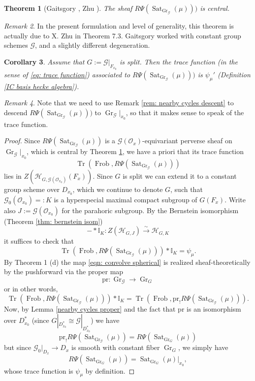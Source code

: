 \documentclass[reqno]{amsart}
\numberwithin{equation}{section}
\newcommand{\mbb}[1]{\mathbb{#1}}
\newcommand{\Cal}[1]{\mathcal{#1}}
\newcommand{\co}{\colon}
\newcommand{\mrm}[1]{\mathrm{#1}}
\DeclareMathOperator{\Frob}{Frob}
\DeclareMathOperator{\Tr}{Tr}
\DeclareMathOperator{\Gr}{Gr}
\DeclareMathOperator{\Sat}{Sat}
\newtheorem{thm}{Theorem}[section]
\newtheorem{cor}[thm]{Corollary}
\theoremstyle{remark}
\newtheorem{remark}[thm]{Remark}
\numberwithin{equation}{section}
\begin{document}
\begin{thm}[Gaitsgory \cite{Gaits01}, Zhu \cite{Zhu14}]\label{gaitsgory central}
The sheaf $R \Psi(\Sat_{\Gr_{\Cal{G}}}(\mu)))$ is central. 
\end{thm}

\begin{remark} 
In the present formulation and level of generality, this theorem is actually due to
X. Zhu in \cite{Zhu14} Theorem 7.3. Gaitsgory worked with constant group schemes $\Cal{G}$, and a slightly different degeneration.
\end{remark}

\begin{cor}\label{gaitsgory nearby function}
Assume that $G := \Cal{G}|_{F_{x_0}}$ is split. Then the trace function (in the sense of \eqref{eq: trace function}) associated to $R \Psi(\Sat_{\Gr_{\Cal{G}}}(\mu)))$ is $\psi_{\mu}'$ (Definition \ref{IC basis hecke algebra}). 
\end{cor}

\begin{remark}
Note that we need to use Remark \ref{rem: nearby cycles descent} to descend $R \Psi(\Sat_{\Gr_{\Cal{G}}}(\mu)))$ to $\Gr_{\Cal{G}}|_{x_0}$, so that it makes sense to speak of the trace function. 
\end{remark}

\begin{proof}
 Since $R \Psi(\Sat_{\Gr_{\Cal{G}}}(\mu))$ is a $\Cal{G}(\Cal{O}_x)$-equivariant perverse sheaf on $\Gr_{\Cal{G}}|_{x_0}$, which is central by Theorem \ref{gaitsgory central}, we have a priori that its trace function
\[
\Tr(\Frob, R \Psi(\Sat_{\Gr_{\Cal{G}}}(\mu)))
\]
lies in $ Z(\Cal{H}_{G,\Cal{G}(\Cal{O}_{x_0}) } (F_x))$. Since $G$ is split we can extend it to a constant group scheme over $D_{x_0}$, which we continue to denote $G$, such that $\Cal{G}_0(\Cal{O}_{x_0}) =: K$ is a hyperspecial maximal compact subgroup of $G(F_x)$. Write also $J := \Cal{G}(\Cal{O}_{x_0})$ for the parahoric subgroup. By the Bernstein isomorphism (Theorem \ref{thm: bernstein isom})
\[
- * \mbb{I}_K \co Z(\Cal{H}_{G,J }) \xrightarrow{\sim} \Cal{H}_{G,K}
\]
it suffices to check that 
\begin{equation}\label{eqn: convolve spherical}
\Tr(\Frob, R \Psi(\Sat_{\Gr_{\Cal{G}}}(\mu))) * \mbb{I}_K =  \psi_{\mu}.
\end{equation}
By \cite{Gaits01} Theorem 1 (d) the  map \eqref{eqn: convolve spherical} is realized sheaf-theoretically by the pushforward via the proper map 
\[
\mrm{pr} \co \Gr_{\Cal{G}} \rightarrow \Gr_{G}
\]
or in other words, 
\[
\Tr(\Frob, R \Psi(\Sat_{\Gr_{\Cal{G}}}(\mu))) * \mbb{I}_K = \Tr(\Frob, \mrm{pr}_! R \Psi(\Sat_{\Gr_{\Cal{G}}}(\mu))).
\]
Now, by Lemma \ref{nearby cycles proper} and the fact that $\mrm{pr}$ is an isomorphism over $D_{x_0}^*$ (since $G|_{D_{x_0}^*} \cong \Cal{G}|_{D_{x_0}^*}$) we have
\[
\mrm{pr}_! R\Psi (\Sat_{\Gr_{\Cal{G}}}(\mu)) = R\Psi ( \Sat_{\Gr_{G}}(\mu))
\]
but since $\Cal{G}_0|_{D_x} \rightarrow D_x$ is smooth with constant fiber $\Gr_G$, we simply have 
\[
R\Psi ( \Sat_{\Gr_{G}}(\mu)) = \Sat_{\Gr_G}(\mu)|_{x_0},
\]
whose trace function is $\psi_{\mu}$ by definition. 
\end{proof}
\end{document}
